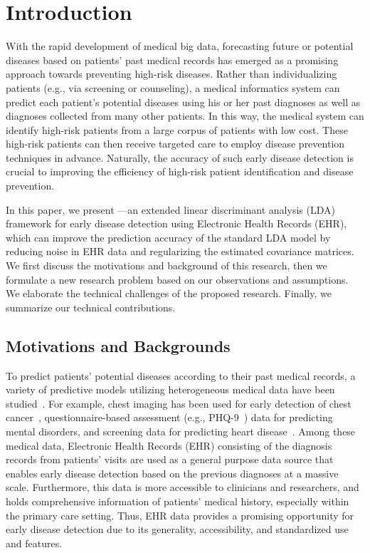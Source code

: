 \section{Introduction}

With the rapid development of medical big data, forecasting future or potential diseases based on patients' past medical records has emerged as a promising approach towards preventing high-risk diseases.
Rather than individualizing patients (e.g., via screening or counseling), a medical informatics system can predict each patient's potential diseases using his or her past diagnoses as well as diagnoses collected from many other patients.
In this way, the medical system can identify high-risk patients from a large corpus of patients with low cost.
These high-risk patients can then receive targeted care to employ disease prevention techniques in advance.
Naturally, the accuracy of such early disease detection is crucial to improving the efficiency of high-risk patient identification and disease prevention. 


In this paper, we present \TheName{}---an extended linear discriminant analysis (LDA)~\cite{fisher1936use,mclachlan2004discriminant} framework for early disease detection using Electronic Health Records (EHR), which can improve the prediction accuracy of the standard LDA model by reducing noise in EHR data and regularizing the estimated covariance matrices.
We first discuss the motivations and background of this research, then we formulate a new research problem based on our observations and assumptions.
We elaborate the technical challenges of the proposed research. 
Finally, we summarize our technical contributions.
 

\subsection{Motivations and Backgrounds}

To predict patients' potential diseases according to their past medical records, a variety of predictive models utilizing heterogeneous medical data have been studied~\cite{soni2011predictive,palaniappan2008intelligent,kumari2011comparative}.
For example, chest imaging has been used for early detection of chest cancer~\cite{FIXME}, questionnaire-based assessment (e.g., PHQ-9~\cite{kroenke2002phq}) data for predicting mental disorders, and screening data for predicting heart disease~\cite{d2001validation}.
Among these medical data, Electronic Health Records (EHR) consisting of the diagnosis records from patients' visits are used as a general purpose data source that enables early disease detection based on the previous diagnoses at a massive scale.
Furthermore, this data is more accessible to clinicians and researchers, and holds comprehensive information of patients' medical history, especially within the primary care setting.
Thus, EHR data provides a promising opportunity for early disease detection due to its generality, accessibility, and standardized use and features. 
 

